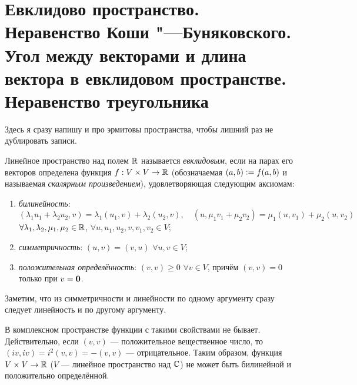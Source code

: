 \section{Евклидово пространство. Неравенство Коши "---Буняковского. Угол между векторами и длина вектора в евклидовом пространстве. Неравенство треугольника}

Здесь я сразу напишу и про эрмитовы пространства, чтобы лишний раз не дублировать записи.

\begin{definition}
    Линейное пространство над полем $\mathbb{R}$ называется \textit{евклидовым}, если на парах его векторов определена функция $f: V \times V \to \mathbb{R}$ (обозначаемая $(a, b) \vcentcolon = f(a, b)$ и называемая \textit{скалярным произведением}), удовлетворяющая следующим аксиомам:
    \begin{enumerate}[nolistsep]
        \item \textit{билинейность}:
            \[
                (\lambda_1u_1 + \lambda_2u_2, v) = \lambda_1(u_1, v) + \lambda_2(u_2, v),\quad(u, \mu_1v_1 + \mu_2v_2) = \mu_1(u, v_1) + \mu_2(u, v_2)
            \]
            $\forall \lambda_1, \lambda_2, \mu_1, \mu_2 \in \mathbb{R}$, $\forall u, u_1, u_2, v, v_1, v_2 \in V$;
        \item \textit{симметричность}: $(u, v) = (v, u)$ $\forall u, v \in V$;
        \item \textit{положительная определённость}: $(v, v) \geqslant 0$ $\forall v \in V$, причём $(v, v) = 0$ только при $v = \boldsymbol{0}$.
    \end{enumerate}
\end{definition}

Заметим, что из симметричности и линейности по одному аргументу сразу следует линейность и по другому аргументу.

\begin{remark}
    В комплексном пространстве функции с такими свойствами не бывает. Действительно, если $(v, v)$ --- положительное вещественное число, то $(iv, iv) = i^2(v, v) = -(v, v)$ --- отрицательное. Таким образом, функция $V \times V \to \mathbb{R}$ ($V$ --- линейное пространство над $\mathbb{C}$) не может быть билинейной и положительно определённой.
\end{remark}

